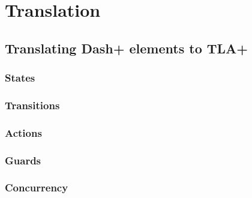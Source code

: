 \chapter{Translation}



\section{Translating Dash+ elements to TLA+}

\subsection{States}

\subsection{Transitions}

\subsection{Actions}

\subsection{Guards}

\subsection{Concurrency}

